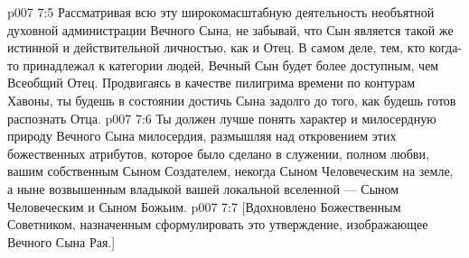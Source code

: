 \vs p007 7:5 \pc Рассматривая всю эту широкомасштабную деятельность необъятной духовной администрации Вечного Сына, не забывай, что Сын является такой же истинной и действительной личностью, как и Отец. В самом деле, тем, кто когда\hyp{}то принадлежал к категории людей, Вечный Сын будет более доступным, чем Всеобщий Отец. Продвигаясь в качестве пилигрима времени по контурам Хавоны, ты будешь в состоянии достичь Сына задолго до того, как будешь готов распознать Отца.
\vs p007 7:6 Ты должен лучше понять характер и милосердную природу Вечного Сына милосердия, размышляя над откровением этих божественных атрибутов, которое было сделано в служении, полном любви, вашим собственным Сыном Создателем, некогда Сыном Человеческим на земле, а ныне возвышенным владыкой вашей локальной вселенной --- Сыном Человеческим и Сыном Божьим.
\vsetoff
\vs p007 7:7 [Вдохновлено Божественным Советником, назначенным сформулировать это утверждение, изображающее Вечного Сына Рая.]
\quizlink
